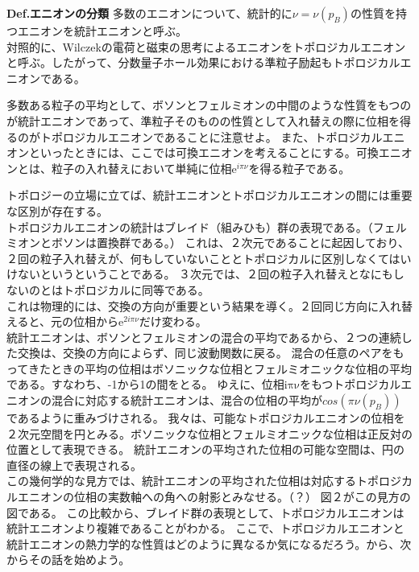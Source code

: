 \documentclass[a4paper,11pt]{jsarticle}
\numberwithin{equation}{section}
\begin{document}
\begin{itembox}[l]{\textbf{Def.エニオンの分類}}
多数のエニオンについて、統計的に$\nu=\nu(p_B)$の性質を持つエニオンを統計エニオンと呼ぶ。\\
対照的に、Wilczekの電荷と磁束の思考によるエニオンをトポロジカルエニオンと呼ぶ。したがって、分数量子ホール効果における準粒子励起もトポロジカルエニオンである。
\end{itembox}

多数ある粒子の平均として、ボソンとフェルミオンの中間のような性質をもつのが統計エニオンであって、準粒子そのものの性質として入れ替えの際に位相を得るのがトポロジカルエニオンであることに注意せよ。
また、トポロジカルエニオンといったときには、ここでは可換エニオンを考えることにする。可換エニオンとは、粒子の入れ替えにおいて単純に位相$\mathrm{e}^{i\pi\nu}$を得る粒子である。

トポロジーの立場に立てば、統計エニオンとトポロジカルエニオンの間には重要な区別が存在する。\\
トポロジカルエニオンの統計はブレイド（組みひも）群の表現である。（フェルミオンとボソンは置換群である。）
これは、２次元であることに起因しており、２回の粒子入れ替えが、何もしていないこととトポロジカルに区別しなくてはいけないというということである。
３次元では、２回の粒子入れ替えとなにもしないのとはトポロジカルに同等である。\\
これは物理的には、交換の方向が重要という結果を導く。２回同じ方向に入れ替えると、元の位相から$\mathrm{e}^{2i\pi \nu}$だけ変わる。\\
統計エニオンは、ボソンとフェルミオンの混合の平均であるから、２つの連続した交換は、交換の方向によらず、同じ波動関数に戻る。
混合の任意のペアをもってきたときの平均の位相はボソニックな位相とフェルミオニックな位相の平均である。すなわち、-1から1の間をとる。
ゆえに、位相$\mathrm{i\pi \nu}$をもつトポロジカルエニオンの混合に対応する統計エニオンは、混合の位相の平均が$cos(\pi \nu(p_B))$であるように重みづけされる。
我々は、可能なトポロジカルエニオンの位相を２次元空間を円とみる。ボソニックな位相とフェルミオニックな位相は正反対の位置として表現できる。
統計エニオンの平均された位相の可能な空間は、円の直径の線上で表現される。\\

この幾何学的な見方では、統計エニオンの平均された位相は対応するトポロジカルエニオンの位相の実数軸への角への射影とみなせる。（？）
図２がこの見方の図である。
この比較から、ブレイド群の表現として、トポロジカルエニオンは統計エニオンより複雑であることがわかる。
ここで、トポロジカルエニオンと統計エニオンの熱力学的な性質はどのように異なるか気になるだろう。から、次からその話を始めよう。
\end{document}
